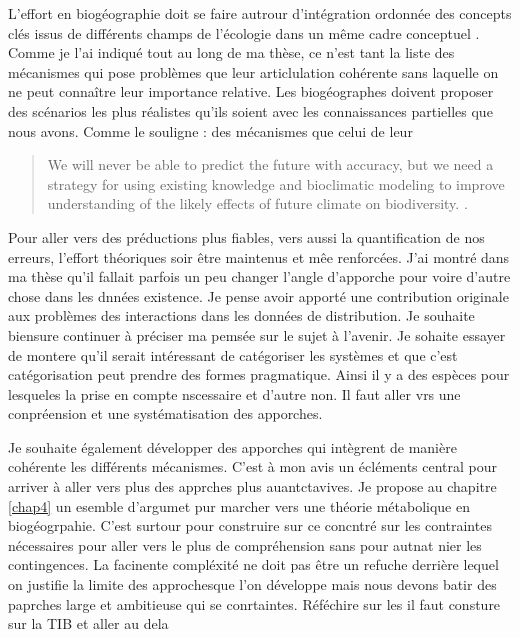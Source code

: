 L'effort en biogéographie doit se faire autrour d'intégration ordonnée
des concepts clés issus de différents champs de l'écologie dans un même
cadre conceptuel \citep{Thuiller2013}. Comme je l'ai indiqué tout au
long de ma thèse, ce n'est tant la liste des mécanismes qui pose
problèmes que leur articlulation cohérente sans laquelle on ne peut
connaître leur importance relative. Les biogéographes doivent proposer
des scénarios les plus réalistes qu'ils soient avec les connaissances
partielles que nous avons. Comme le souligne \citet{Araujo2006}: des
mécanismes que celui de leur

\begin{quote}
We will never be able to predict the future with accuracy, but we need a
strategy for using existing knowledge and bioclimatic modeling to
improve understanding of the likely effects of future climate on
biodiversity. \citep{Araujo2006}.
\end{quote}

Pour aller vers des préductions plus fiables, vers aussi la
quantification de nos erreurs, l'effort théoriques soir être maintenus
et mêe renforcées. J'ai montré dans ma thèse qu'il fallait parfois un
peu changer l'angle d'apporche pour voire d'autre chose dans les dnnées
existence. Je pense avoir apporté une contribution originale aux
problèmes des interactions dans les données de distribution. Je souhaite
biensure continuer à préciser ma pemsée sur le sujet à l'avenir. Je
sohaite essayer de montere qu'il serait intéressant de catégoriser les
systèmes et que c'est catégorisation peut prendre des formes
pragmatique. Ainsi il y a des espèces pour lesqueles la prise en compte
nscessaire et d'autre non. Il faut aller vrs une conpréension et une
systématisation des apporches.

Je souhaite également développer des apporches qui intègrent de manière
cohérente les différents mécanismes. C'est à mon avis un écléments
central pour arriver à aller vers plus des apprches plus auantctavives.
Je propose au chapitre \ref{chap4} un esemble d'argumet pur marcher vers
une théorie métabolique en biogéogrpahie. C'est surtour pour construire
sur ce concntré sur les contraintes nécessaires pour aller vers le plus
de compréhension sans pour autnat nier les contingences. La facinente
compléxité ne doit pas être un refuche derrière lequel on justifie la
limite des approchesque l'on développe mais nous devons batir des
paprches large et ambitieuse qui se conrtaintes. Réféchire sur les il
faut consture sur la TIB et aller au dela

